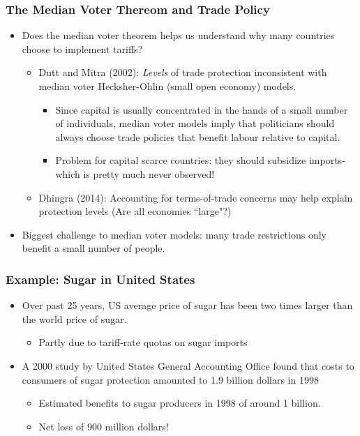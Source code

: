 \documentclass{beamer}
\begin{document}
\begin{frame}
	\frametitle{The Median Voter Thereom and Trade Policy}
\begin{itemize}
	\item Does the median voter theorem helps us understand why many countries choose to implement tariffs?
	\begin{itemize}
		\item Dutt and Mitra (2002): \emph{Levels} of trade protection inconsistent with median voter Hecksher-Ohlin (small open economy) models.
			\begin{itemize}
				\item Since capital is usually concentrated in the hands of a small number of individuals, median voter models imply that politicians should always choose trade policies that benefit labour relative to capital.
				\item Problem for capital scarce countries: they should subsidize imports- which is pretty much never observed!
			\end{itemize}
		\item Dhingra (2014): Accounting for terms-of-trade concerns may help explain protection levels (Are all economies ``large"?)
	\end{itemize}
\item Biggest challenge to median voter models: many trade restrictions only benefit a small number of people.
\end{itemize}
\end{frame}
	



\begin{frame}
	\frametitle{Example: Sugar in United States}
	
\begin{itemize}
\item Over past 25 years, US average price of sugar has been two times larger than the world price of sugar.
	\begin{itemize}
		\item Partly due to tariff-rate quotas on sugar imports
	\end{itemize}
\item A 2000 study by United States General Accounting Office found that costs to consumers of sugar protection amounted to 1.9 billion dollars in 1998
	\begin{itemize}
		\item Estimated benefits to sugar producers in 1998 of around 1 billion. 
		\item Net loss of 900 million dollars!
	\end{itemize}
\end{itemize}

\end{frame}
\end{document}
